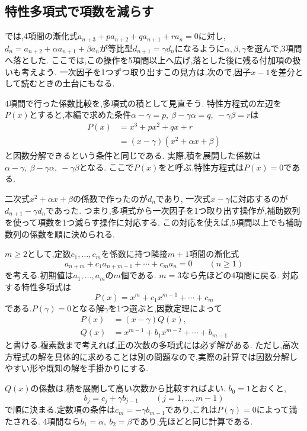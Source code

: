 \subsection{特性多項式で項数を減らす}\label{節：特性多項式で項数を減らす}
では,4項間の漸化式$a_{n+3}+pa_{n+2}+qa_{n+1}+ra_n=0$に対し,$d_n=a_{n+2}+\alpha a_{n+1}+\beta a_n$が等比型$d_{n+1}=\gamma d_n$になるように$\alpha,\beta,\gamma$を選んで,3項間へ落とした.
ここでは,この操作を5項間以上へ広げ,落とした後に残る付加項の扱いも考えよう.
一次因子を1つずつ取り出すこの見方は,次ので,因子$x-1$を差分として読むときの土台にもなる.

4項間で行った係数比較を,多項式の積として見直そう.
特性方程式の左辺を$P(x)$とすると,本編で求めた条件$\alpha-\gamma=p,\ \beta-\gamma\alpha=q,\ -\gamma\beta=r$は
\[
  \begin{aligned}
    P(x)&=x^3+px^2+qx+r\\
        &=(x-\gamma)(x^2+\alpha x+\beta)
  \end{aligned}
\]
と因数分解できるという条件と同じである.
実際,積を展開した係数は$\alpha-\gamma,\ \beta-\gamma\alpha,\ -\gamma\beta$となる.
ここで$P(x)$を\textbf{}と呼ぶ.特性方程式は$P(x)=0$である.

二次式$x^2+\alpha x+\beta$の係数で作ったのが$d_n$であり,
一次式$x-\gamma$に対応するのが$d_{n+1}-\gamma d_n$であった.
つまり,多項式から一次因子を1つ取り出す操作が,補助数列を使って項数を1つ減らす操作に対応する.
この対応を使えば,5項間以上でも補助数列の係数を順に決められる.

$m\ge2$として,定数$c_1,\ldots,c_m$を係数に持つ隣接$m+1$項間の漸化式
\[
  a_{n+m}+c_1a_{n+m-1}+\cdots+c_ma_n=0
  \qquad(n\ge1)
\]
を考える.初期値は$a_1,\ldots,a_m$の$m$個である.
$m=3$なら先ほどの4項間に戻る.
対応する特性多項式は
\[
  P(x)=x^m+c_1x^{m-1}+\cdots+c_m
\]
である.$P(\gamma)=0$となる解$\gamma$を1つ選ぶと,因数定理によって
\[
  \begin{aligned}
    P(x)&=(x-\gamma)Q(x),\\
    Q(x)&=x^{m-1}+b_1x^{m-2}+\cdots+b_{m-1}
  \end{aligned}
\]
と書ける.複素数まで考えれば,正の次数の多項式には必ず解がある.
ただし,高次方程式の解を具体的に求めることは別の問題なので,実際の計算では因数分解しやすい形や既知の解を手掛かりにする.

$Q(x)$の係数は,積を展開して高い次数から比較すればよい.
$b_0=1$とおくと,
\[
  b_j=c_j+\gamma b_{j-1}
  \qquad(j=1,\ldots,m-1)
\]
で順に決まる.定数項の条件は$c_m=-\gamma b_{m-1}$であり,これは$P(\gamma)=0$によって満たされる.
4項間なら$b_1=\alpha,\ b_2=\beta$であり,先ほどと同じ計算である.

